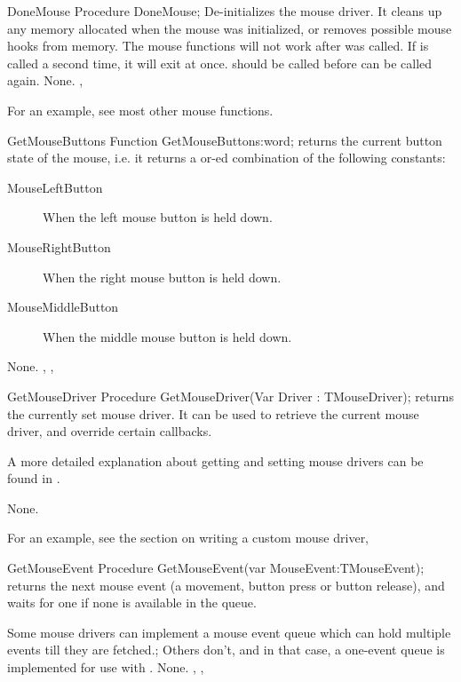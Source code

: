 
\begin{procedure}{DoneMouse}
\Declaration
Procedure DoneMouse;
\Description
{} De-initializes the mouse driver. It cleans up any memory
allocated when the mouse was initialized, or removes possible mouse hooks
from memory. The mouse functions will not work after  was
called. If  is called a second time, it will exit at once.
 should be called before  can be called again.
\Errors
None.
\SeeAlso
{}, 
\end{procedure}

For an example, see most other mouse functions.

\begin{function}{GetMouseButtons}
\Declaration
Function GetMouseButtons:word;
\Description
{} returns the current button state of the mouse, i.e.
it returns a or-ed combination of the following constants:
\begin{description}
\item[MouseLeftButton] When the left mouse button is held down.
\item[MouseRightButton] When the right mouse button is held down.
\item[MouseMiddleButton] When the middle mouse button is held down.
\end{description}
\Errors
None.
\SeeAlso
{}, , 
\end{function}


\begin{procedure}{GetMouseDriver}
\Declaration
Procedure GetMouseDriver(Var Driver : TMouseDriver);
\Description
{} returns the currently set mouse driver. It can be used
to retrieve the current mouse driver, and override certain callbacks.

A more detailed explanation about getting and setting mouse drivers can be found in
.

\Errors
None.
\SeeAlso
{}
\end{procedure}

For an example, see the section on writing a custom mouse driver,

\begin{procedure}{GetMouseEvent}
\Declaration
Procedure GetMouseEvent(var MouseEvent:TMouseEvent);
\Description
{} returns the next mouse event (a movement, button press or
button release), and waits for one if none is available in the queue.

Some mouse drivers can implement a mouse event queue which can hold multiple
events till they are fetched.; Others don't, and in that case, a one-event
queue is implemented for use with .
\Errors
None.
\SeeAlso
{}, , 
\end{procedure}

